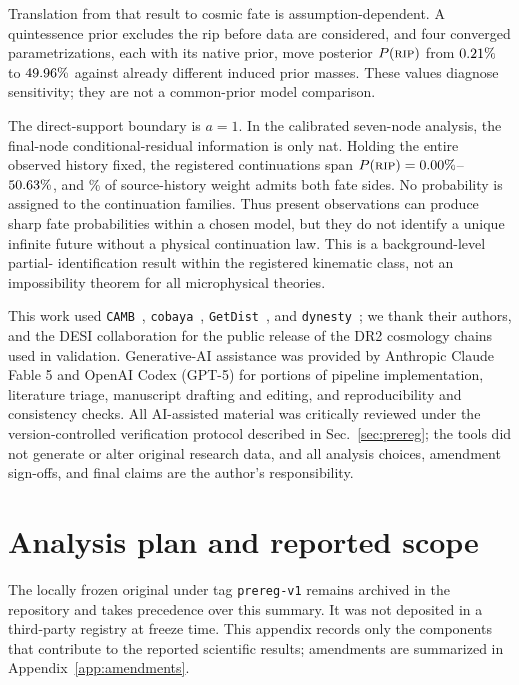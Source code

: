 \documentclass[a4paper,11pt]{article}
\begin{document}
Translation from that result to cosmic fate is assumption-dependent. A
quintessence prior excludes the rip before data are considered, and four
converged parametrizations, each with its native prior, move posterior
$P(\textsc{rip})$ from
$0.21\%$ to $49.96\%$ against already different
induced prior masses. These values diagnose sensitivity; they are not a
common-prior model comparison.

The direct-support boundary is $a=1$. In the calibrated seven-node analysis,
the final-node conditional-residual information is only
\WPSevenResidualKL{} nat. Holding the entire observed history fixed, the
registered continuations span
$P(\textsc{rip})=0.00\%$--
$50.63\%$, and \WPEightTwoSidedPct\% of source-history
weight admits both fate sides. No probability is assigned to the continuation
families. Thus present observations can produce sharp fate probabilities
within a chosen model, but they do not identify a unique infinite future
without a physical continuation law. This is a background-level partial-
identification result within the registered kinematic class, not an
impossibility theorem for all microphysical theories.

\acknowledgments
This work used \texttt{CAMB}~\cite{CAMB}, \texttt{cobaya}~\cite{cobaya},
\texttt{GetDist}~\cite{getdist}, and \texttt{dynesty}~\cite{dynesty}; we thank
their authors, and the DESI collaboration for the public release of the DR2
cosmology chains used in validation. Generative-AI assistance was provided by
Anthropic Claude Fable 5 and OpenAI Codex (GPT-5) for portions of pipeline
implementation, literature triage, manuscript drafting and editing, and
reproducibility and consistency checks. All AI-assisted material was
critically reviewed under the version-controlled verification protocol
described in Sec.~\ref{sec:prereg}; the tools did not generate or alter
original research data, and all analysis choices, amendment sign-offs, and
final claims are the author's responsibility.

\appendix

\section{Analysis plan and reported scope}\label{app:plan}

The locally frozen original under tag \texttt{prereg-v1} remains archived in
the repository and takes precedence over this summary. It was not deposited
in a third-party registry at freeze time. This appendix records only the
components that contribute to the reported scientific results; amendments are
summarized in Appendix~\ref{app:amendments}.
\end{document}
